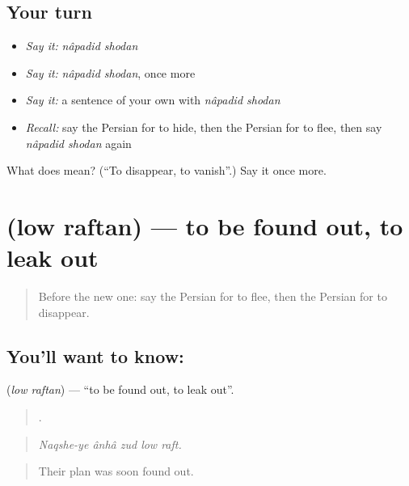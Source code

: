 \subsection*{Your turn}
\begin{itemize}
\raggedright
  \item \emph{Say it:} \emph{nâpadid shodan}
  \item \emph{Say it:} \emph{nâpadid shodan}, once more
  \item \emph{Say it:} a sentence of your own with \emph{nâpadid shodan}
  \item \emph{Recall:} say the Persian for to hide, then the Persian for to flee, then say \emph{nâpadid shodan} again
\end{itemize}

\begin{tcolorbox}[breakable,colback=teal!4,colframe=teal!35!black,title={Before you move on}]
What does   mean? (\textquotedblleft{}To disappear, to vanish\textquotedblright{}.) Say it once more.
\end{tcolorbox}
\section[\texorpdfstring{\fa{لو} \fa{رفتن} (low raftan)}{لو رفتن (low raftan)}]{  (low raftan) — to be found out, to leak out}

\label{lesson:FA-C317-low-raftan}



\begin{quote}
Before the new one: say the Persian for to flee, then the Persian for to disappear.
\end{quote}

\subsection*{You'll want to know:  }
\textbf{ } (\emph{low raftan}) — \textquotedblleft{}to be found out, to leak out\textquotedblright{}.

\begin{quote}
    .
\end{quote}

\begin{quote}
\emph{Naqshe-ye ânhâ zud low raft.}
\end{quote}

\begin{quote}
Their plan was soon found out.
\end{quote}

